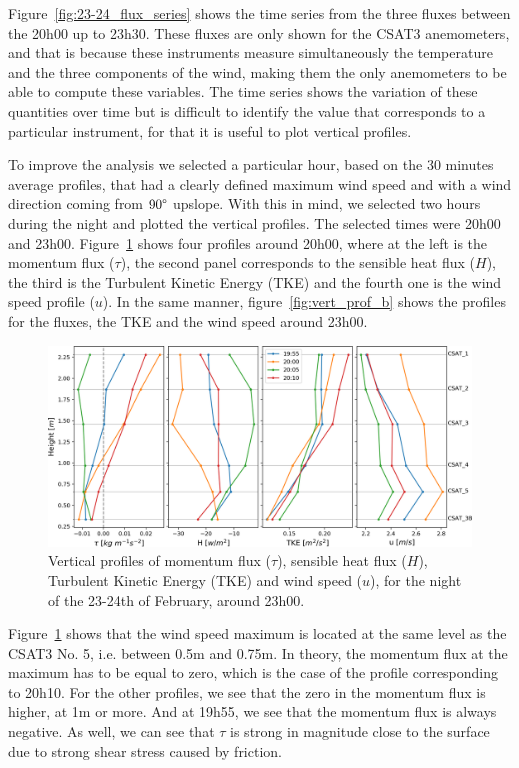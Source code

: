 Figure~\ref{fig:23-24_flux_series} shows the time series from the three fluxes between the 20h00 up to 23h30. These fluxes are only shown for the CSAT3 anemometers, and that is because these instruments measure simultaneously the temperature and the three components of the wind, making them the only anemometers to be able to compute these variables. The time series shows the variation of these quantities over time but is difficult to identify the value that corresponds to a particular instrument, for that it is useful to plot vertical profiles.

To improve the analysis we selected a particular hour, based on the 30 minutes average profiles, that had a clearly defined maximum wind speed and with a wind direction coming from $90\degree$ upslope. With this in mind, we selected two hours during the night and plotted the vertical profiles. The selected times were 20h00 and 23h00. Figure~\ref{fig:vert_prof_a} shows four profiles around 20h00, where at the left is the momentum flux ($\tau$), the second panel corresponds to the sensible heat flux ($H$), the third is the Turbulent Kinetic Energy (TKE) and the fourth one is the wind speed profile ($u$). In the same manner, figure~\ref{fig:vert_prof_b} shows the profiles for the fluxes, the TKE and the wind speed around 23h00. 

\begin{figure}
    \centering
    \includegraphics[width=1\textwidth]{fig/chapter_4/23-24/vert_prof_a_speedmax.png}
    \caption{Vertical profiles of momentum flux ($\tau$), sensible heat flux ($H$), Turbulent Kinetic Energy (TKE) and wind speed ($u$), for the night of the 23-24th of February, around 23h00.}
    \label{fig:vert_prof_a}
\end{figure}

Figure~\ref{fig:vert_prof_a} shows that the wind speed maximum is located at the same level as the CSAT3 No. 5, i.e. between 0.5m and 0.75m. In theory, the momentum flux at the maximum has to be equal to zero, which is the case of the profile corresponding to 20h10. For the other profiles, we see that the zero in the momentum flux is higher, at 1m or more. And at 19h55, we see that the momentum flux is always negative. As well, we can see that $\tau$ is strong in magnitude close to the surface due to strong shear stress caused by friction. 

